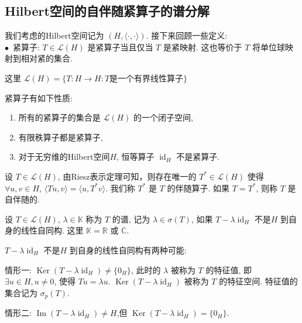 \documentclass[11pt]{ctexart}[UTF8]
\begin{document}
\subsection{Hilbert空间的自伴随紧算子的谱分解}
我们考虑的Hilbert空间记为 $(H,\langle \cdot, \cdot \rangle)$. 接下来回顾一些定义:\\
$\bullet$\ 紧算子: $T \in \mathcal{L}(H)$ 是紧算子当且仅当 $T$ 是紧映射. 这也等价于 $T$ 将单位球映射到相对紧的集合. 
\begin{remark}
    这里 $\mathcal{L}(H) = \{ T: H \to H : T \text{是一个有界线性算子} \}$
\end{remark}
紧算子有如下性质:
\begin{proposition}\leavevmode
    \begin{enumerate}
        \item 所有的紧算子的集合是 $\mathcal{L}(H)$ 的一个闭子空间,
        \item 有限秩算子都是紧算子, 
        \item 对于无穷维的Hilbert空间$H$, 恒等算子 $\operatorname{id}_{H}$ 不是紧算子.
    \end{enumerate}
\end{proposition}
\begin{definition}[(自)伴随算子]
    设 $T \in \mathcal{L}(H)$, 由Riesz表示定理可知，则存在唯一的 $T^* \in \mathcal{L}(H)$ 使得 
    $\forall u, v \in H$, $\langle Tu, v \rangle = \langle u, T^*v \rangle$. 我们称 $T^*$ 是 $T$ 的伴随算子. 如果 $T = T^*$, 则称 $T$ 是自伴随的.
\end{definition}
\begin{definition}[谱]
    设 $T \in \mathcal{L}(H)$, $\lambda \in \mathbb{K}$ 称为 $T$ 的谱, 记为 $\lambda \in \sigma(T)$, 如果 $T-\lambda \operatorname{id}_{H}$ 不是$H$ 到自身的线性自同构. 
    这里 $\mathbb{K} = \mathbb{R}$ 或 $\mathbb{C}$.
\end{definition}
\begin{remark}
    $T-\lambda \operatorname{id}_{H}$ 不是$H$ 到自身的线性自同构有两种可能:\par
    情形一: $\operatorname{Ker}(T-\lambda \operatorname{id}_{H}) \neq \{0_{H}\}$, 此时的 $\lambda$ 被称为 $T$ 的特征值, 即 $\exists u \in H, u \neq 0$, 使得 $T u = \lambda u$. 
    $\operatorname{Ker}(T-\lambda \operatorname{id}_{H})$ 被称为 $T$ 的特征空间. 特征值的集合记为 $\sigma_{p}(T)$.\par
    情形二: $\operatorname{Im}(T-\lambda \operatorname{id}_{H}) \neq H$,但 $\operatorname{Ker}(T-\lambda \operatorname{id}_{H}) = \{0_{H}\}$.
\end{remark}
\end{document}
